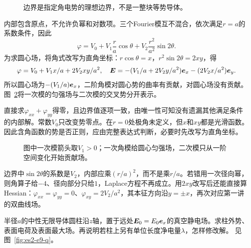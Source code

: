 \begin{figure}[H]\centering
{}
\caption{边界是指定角电势的理想边界，不是一整块等势导体。}\label{fig:es2-e8-q}
\end{figure}
\begin{solution}
内部包含原点，不允许负幂和对数项。三个Fourier模互不混合，依次满足$r=a$的系数条件，因此
\[\varphi=V_0+V_1\frac ra\cos\theta+V_2\frac{r^2}{a^2}\sin2\theta.
\]
为求圆心场，将角式改写为直角坐标：$r\cos\theta=x$，$r^2\sin2\theta=2xy$，得
\[\varphi=V_0+V_1x/a+2V_2xy/a^2,\quad
\bm{E}=-(V_1/a+2V_2y/a^2)\bm{e}_x-(2V_2x/a^2)\bm{e}_y.
\]
所以圆心场为$-(V_1/a)\bm{e}_x$，二阶角模对圆心势的曲率有贡献，对圆心场没有贡献。图~\ref{fig:es2-e8-s}将一次模的匀强场与二次模的交叉势分开表示。

直接求$\varphi_{xx}+\varphi_{yy}$得零，且边界值逐项一致，由唯一性可知没有遗漏其他满足条件的内部解。常数$V_0$只改变势零点。在$r=0$处极角未定义，但$x$和$xy$都是光滑函数。因此含角函数的势是否正则，应由完整表达式判断，必要时先改写为直角坐标。
\begin{figure}[H]\centering
{}
\caption{图中一次模箭头取$V_1>0$；一次角模给圆心匀强场，二次模只从一阶空间变化开始贡献场。}\label{fig:es2-e8-s}
\end{figure}


边界中$\sin2\theta$的系数是$V_2$，内部应乘$(r/a)^2$，而不是乘$r/a$。若错用一次径向幂，则角算子给$-4$、径向部分只给$1$，Laplace方程不再成立。用$2xy$改写后还能直接算Hessian：$\varphi_{xx}=\varphi_{yy}=0$、$\varphi_{xy}=2V_2/a^2$，其本征方向沿$y=\pm x$，再次对应第一讲的双曲线场。
\end{solution}

\begin{example}[匀强场中的无限导体圆柱]\label{ex:es2-e9}
半径$a$的中性无限导体圆柱沿$z$轴，置于远处$\bm{E}_0=E_0\bm{e}_x$的真空静电场。求柱外势、表面电荷及表面最大场。再说明若柱上另有单位长度净电量$\lambda$，怎样修改解。 见图~\ref{fig:es2-e9-q}。
\end{example}

